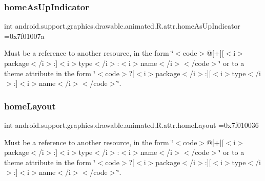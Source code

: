 \subsubsection{\texorpdfstring{home\+As\+Up\+Indicator}{homeAsUpIndicator}}
{\footnotesize\ttfamily int android.\+support.\+graphics.\+drawable.\+animated.\+R.\+attr.\+home\+As\+Up\+Indicator =0x7f01007a\hspace{0.3cm}{\ttfamily [static]}}

Must be a reference to another resource, in the form \char`\"{}$<$code$>$@\mbox{[}+\mbox{]}\mbox{[}$<$i$>$package$<$/i$>$\+:\mbox{]}$<$i$>$type$<$/i$>$\+:$<$i$>$name$<$/i$>$$<$/code$>$\char`\"{} or to a theme attribute in the form \char`\"{}$<$code$>$?\mbox{[}$<$i$>$package$<$/i$>$\+:\mbox{]}\mbox{[}$<$i$>$type$<$/i$>$\+:\mbox{]}$<$i$>$name$<$/i$>$$<$/code$>$\char`\"{}. \mbox{\label{classandroid_1_1support_1_1graphics_1_1drawable_1_1animated_1_1R_1_1attr_af62d1d140834e96bf14c5d7552c18ad3}} 
\subsubsection{\texorpdfstring{home\+Layout}{homeLayout}}
{\footnotesize\ttfamily int android.\+support.\+graphics.\+drawable.\+animated.\+R.\+attr.\+home\+Layout =0x7f010036\hspace{0.3cm}{\ttfamily [static]}}

Must be a reference to another resource, in the form \char`\"{}$<$code$>$@\mbox{[}+\mbox{]}\mbox{[}$<$i$>$package$<$/i$>$\+:\mbox{]}$<$i$>$type$<$/i$>$\+:$<$i$>$name$<$/i$>$$<$/code$>$\char`\"{} or to a theme attribute in the form \char`\"{}$<$code$>$?\mbox{[}$<$i$>$package$<$/i$>$\+:\mbox{]}\mbox{[}$<$i$>$type$<$/i$>$\+:\mbox{]}$<$i$>$name$<$/i$>$$<$/code$>$\char`\"{}. \mbox{\label{classandroid_1_1support_1_1graphics_1_1drawable_1_1animated_1_1R_1_1attr_ad1181f34c4a4555c73a20dcad366a28e}} 
